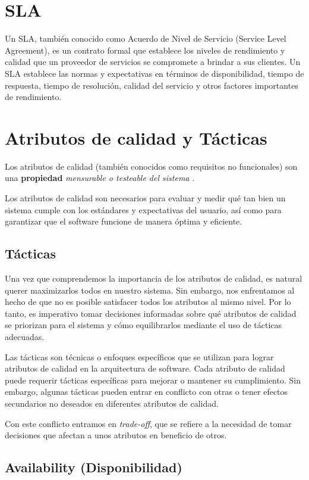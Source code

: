 \documentclass{article}
\begin{document}
		\section{SLA}
		Un SLA, también conocido como Acuerdo de Nivel de Servicio (Service Level Agreement), es un contrato formal que establece los niveles de rendimiento y calidad que un proveedor de servicios se compromete a brindar a sus clientes. Un SLA establece las normas y expectativas en términos de disponibilidad, tiempo de respuesta, tiempo de resolución, calidad del servicio y otros factores importantes de rendimiento.
		
		
		\section{Atributos de calidad y Tácticas}
			Los atributos de calidad (también conocidos como requisitos no funcionales) son una \textbf{propiedad} \textit{mensurable o testeable del sistema} .
			
			Los atributos de calidad son necesarios para evaluar y medir qué tan bien un sistema cumple con los estándares y expectativas del usuario, así como para garantizar que el software funcione de manera óptima y eficiente.

			
		\subsection{Tácticas}
			Una vez que comprendemos la importancia de los atributos de calidad, es natural querer maximizarlos todos en nuestro sistema. Sin embargo, nos enfrentamos al hecho de que no es posible satisfacer todos los atributos al mismo nivel. Por lo tanto, es imperativo tomar decisiones informadas sobre qué atributos de calidad se priorizan para el sistema y cómo equilibrarlos mediante el uso de tácticas adecuadas.
			
			Las tácticas son técnicas o enfoques específicos que se utilizan para lograr atributos de calidad en la arquitectura de software. Cada atributo de calidad puede requerir tácticas específicas para mejorar o mantener su cumplimiento. Sin embargo, algunas tácticas pueden entrar en conflicto con otras o tener efectos secundarios no deseados en diferentes atributos de calidad.
			
			Con este conflicto entramos en \textit{trade-off}, que se refiere a la necesidad de tomar decisiones que afectan a unos atributos en beneficio de otros.

		
		\subsection{Availability \small{(Disponibilidad)}}
		
\end{document}
